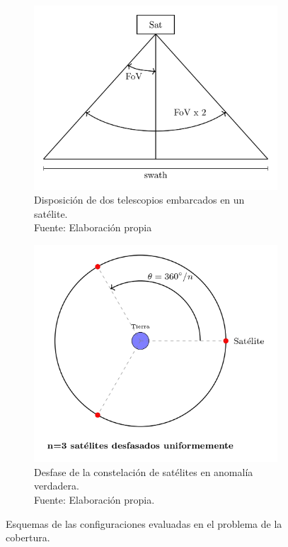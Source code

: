 \begin{figure}[H]
    \centering
    \begin{subfigure}[t]{0.45\textwidth}
        \centering
        \includegraphics[width=\linewidth]{4.Payload/TFG_Tikz-2.jpg}
        \caption{Disposición de dos telescopios embarcados en un satélite. \\ Fuente: Elaboración propia}
        \label{fig:img1}
    \end{subfigure}
    \hspace{0.05\textwidth}
    \begin{subfigure}[t]{0.45\textwidth}
        \centering
        \includegraphics[width=\linewidth]{4.Payload/TFG_Tikz-3.jpg}
        \caption{Desfase de la constelación de satélites en anomalía verdadera. \\ Fuente: Elaboración propia.}
        \label{fig:img2}
    \end{subfigure}
    \caption{Esquemas de las configuraciones evaluadas en el problema de la cobertura.}
    \label{fig:configs}
\end{figure}

